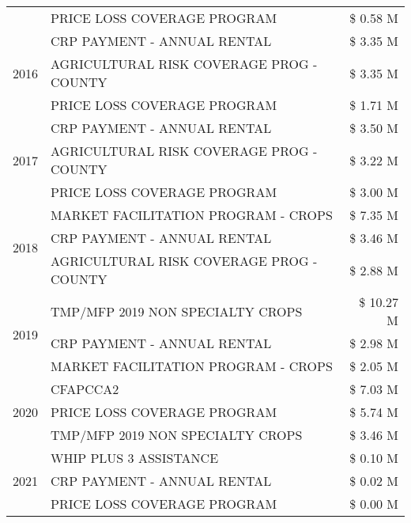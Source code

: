 \begin{tabular}{llr}
 & PRICE LOSS COVERAGE PROGRAM & \$ 0.58 M \\
\cline{1-3}
\multirow[t]{3}{*}{2016} & CRP PAYMENT - ANNUAL RENTAL & \$ 3.35 M \\
 & AGRICULTURAL RISK COVERAGE PROG - COUNTY & \$ 3.35 M \\
 & PRICE LOSS COVERAGE PROGRAM & \$ 1.71 M \\
\cline{1-3}
\multirow[t]{3}{*}{2017} & CRP PAYMENT - ANNUAL RENTAL & \$ 3.50 M \\
 & AGRICULTURAL RISK COVERAGE PROG - COUNTY & \$ 3.22 M \\
 & PRICE LOSS COVERAGE PROGRAM & \$ 3.00 M \\
\cline{1-3}
\multirow[t]{3}{*}{2018} & MARKET FACILITATION PROGRAM - CROPS & \$ 7.35 M \\
 & CRP PAYMENT - ANNUAL RENTAL & \$ 3.46 M \\
 & AGRICULTURAL RISK COVERAGE PROG - COUNTY & \$ 2.88 M \\
\cline{1-3}
\multirow[t]{3}{*}{2019} & TMP/MFP 2019 NON SPECIALTY CROPS & \$ 10.27 M \\
 & CRP PAYMENT - ANNUAL RENTAL & \$ 2.98 M \\
 & MARKET FACILITATION PROGRAM - CROPS & \$ 2.05 M \\
\cline{1-3}
\multirow[t]{3}{*}{2020} & CFAPCCA2 & \$ 7.03 M \\
 & PRICE LOSS COVERAGE PROGRAM & \$ 5.74 M \\
 & TMP/MFP 2019 NON SPECIALTY CROPS & \$ 3.46 M \\
\cline{1-3}
\multirow[t]{3}{*}{2021} & WHIP PLUS 3 ASSISTANCE & \$ 0.10 M \\
 & CRP PAYMENT - ANNUAL RENTAL & \$ 0.02 M \\
 & PRICE LOSS COVERAGE PROGRAM & \$ 0.00 M \\
\cline{1-3}
\bottomrule
\end{tabular}
